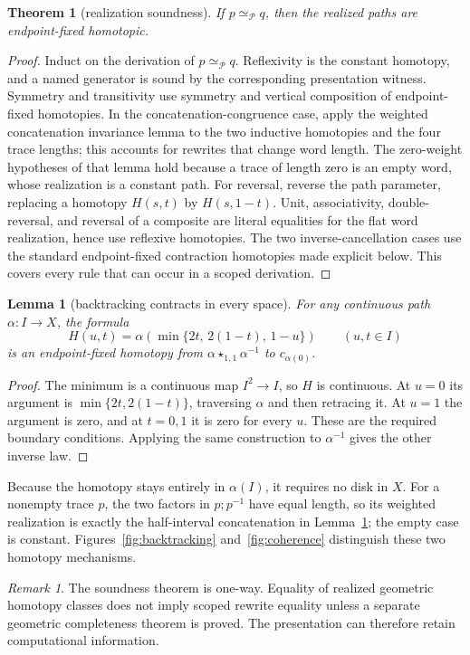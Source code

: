 \documentclass[10pt,reqno]{amsart}
\theoremstyle{definition}
\theoremstyle{plain}
\newtheorem{theorem}[definition]{Theorem}
\newtheorem{lemma}[definition]{Lemma}
\theoremstyle{remark}
\newtheorem{remark}[definition]{Remark}
\newcommand{\RwEq}{\mathrel{\simeq_{\!\mathcal P}}}
\begin{document}
\begin{theorem}[realization soundness]
\label{thm:realization-soundness}
If $p\RwEq q$, then the realized paths are endpoint-fixed homotopic.
\end{theorem}

\begin{proof}
Induct on the derivation of $p\RwEq q$.  Reflexivity is the constant
homotopy, and a named generator is sound by the corresponding presentation
witness.  Symmetry and transitivity use symmetry and vertical composition of
endpoint-fixed homotopies.  In the concatenation-congruence case, apply the
weighted concatenation invariance lemma to the two inductive homotopies and
the four trace lengths; this accounts for rewrites that change word length.
The zero-weight hypotheses of that lemma hold because a trace of length zero
is an empty word, whose realization is a constant path.
For reversal, reverse the path parameter, replacing a homotopy $H(s,t)$ by
$H(s,1-t)$.  Unit, associativity,
double-reversal, and reversal of a composite are literal equalities for the
flat word realization, hence use reflexive homotopies.  The two
inverse-cancellation cases use the standard
endpoint-fixed contraction homotopies made explicit below.  This covers every rule that can occur in a scoped derivation.
\end{proof}

\begin{lemma}[backtracking contracts in every space]
\label{lem:backtracking}
For any continuous path $\alpha:I\to X$, the formula
\[
 H(u,t)=\alpha\!\left(\min\{2t,\,2(1-t),\,1-u\}\right)
 \qquad (u,t\in I)
\]
is an endpoint-fixed homotopy from
$\alpha\star_{1,1}\alpha^{-1}$ to $c_{\alpha(0)}$.
\end{lemma}
\begin{proof}
The minimum is a continuous map $I^2\to I$, so $H$ is continuous.
At $u=0$ its argument is $\min\{2t,2(1-t)\}$, traversing $\alpha$
and then retracing it. At $u=1$ the argument is zero, and at $t=0,1$
it is zero for every $u$. These are the required boundary conditions.
Applying the same construction to $\alpha^{-1}$ gives the other inverse law.
\end{proof}

Because the homotopy stays entirely in $\alpha(I)$, it requires no disk in $X$.
For a nonempty trace $p$, the two factors in $p;p^{-1}$ have equal length,
so its weighted realization is exactly the half-interval concatenation
in Lemma~\ref{lem:backtracking}; the empty case is constant.
Figures~\ref{fig:backtracking} and~\ref{fig:coherence} distinguish these two homotopy mechanisms.
\begin{remark}
The soundness theorem is one-way.  Equality of realized geometric homotopy
classes does not imply scoped rewrite equality unless a separate geometric
completeness theorem is proved.  The presentation can therefore retain computational information.
\end{remark}
\end{document}
